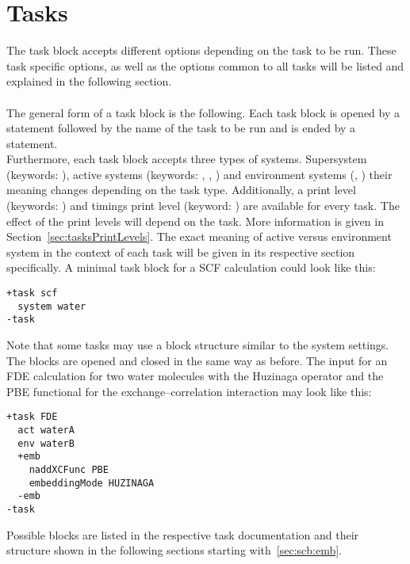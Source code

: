 \clearpage
\section{Tasks}
\label{sec:tasks}
The task block accepts different options depending on the task to be run.
These task specific options, as well as the options common to all tasks will be listed and explained
in the following section.\\
\\
The general form of a task block is the following.
Each task block is opened by a  statement followed by the name of the
task to be run and is ended by a  statement.\\
Furthermore, each task block accepts three types of systems. Supersystem (keywords: ),
active  systems (keywords: , , ) and environment systems
(, ) their meaning changes depending
on the task type. Additionally, a print level (keywords: ) and timings
print level (keyword: ) are available
for every task. The effect of the print levels will depend on the task. More information
is given in Section~\ref{sec:tasksPrintLevels}.
The exact meaning of active versus environment system in the context of each task will be 
given in its respective section specifically.
A minimal task block for a SCF calculation could look like this:
\begin{lstlisting}
+task scf
  system water
-task
\end{lstlisting}
Note that some tasks may use a block structure similar to the system settings.
The blocks are opened and closed in the same way as before. The input for an
FDE calculation for two water molecules with the Huzinaga operator and the
PBE functional for the exchange--correlation interaction may look like this:
\begin{lstlisting}
+task FDE
  act waterA
  env waterB
  +emb
    naddXCFunc PBE
    embeddingMode HUZINAGA
  -emb
-task
\end{lstlisting}
Possible blocks are listed in the respective task documentation and their
structure shown in the following sections starting with~\ref{sec:scb:emb}.

